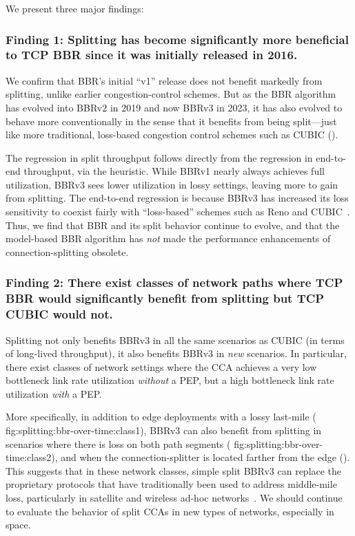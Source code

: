 We present three major findings:

\subsubsection{Finding 1: Splitting has become significantly more beneficial to
 TCP BBR since it was initially released in 2016.}

We confirm that BBR's initial ``v1'' release does not benefit markedly from splitting, unlike earlier
congestion-control schemes. But as the BBR algorithm
has evolved into BBRv2 in 2019 and now BBRv3 in 2023, it has also evolved to
behave more conventionally in the sense that it benefits from being
split---just like more traditional, loss-based congestion control schemes such
as CUBIC ().

The regression in split throughput follows directly from the regression
in end-to-end throughput, via the heuristic. While BBRv1 nearly always achieves
full utilization, BBRv3 sees lower utilization in lossy
settings, leaving more to gain from splitting.
The end-to-end regression is because BBRv3 has increased its loss sensitivity
to coexist fairly with ``loss-based'' schemes such as Reno and
CUBIC~\cite{cardwell2024bbrv3-ietf119,ware2019modeling,zeynali2024promises}.
Thus, we find that BBR and its split behavior continue
to evolve, and that the model-based BBR algorithm has \textit{not} made the
performance enhancements of connection-splitting obsolete.

\subsubsection{Finding 2: There exist classes of network paths where TCP BBR
 would significantly benefit from splitting but TCP CUBIC would not.}

Splitting not only benefits BBRv3 in all the same scenarios as CUBIC (in terms
of long-lived throughput), it also benefits BBRv3 in \textit{new} scenarios. In
particular, there exist classes of network settings where the CCA achieves a
very low bottleneck link rate utilization \textit{without} a PEP, but a high
bottleneck link rate utilization \textit{with} a PEP.

More specifically, in addition to edge deployments with a lossy last-mile (\Cref
{fig:splitting:bbr-over-time:class1}), BBRv3 can also benefit from splitting in
scenarios where there is loss on both path segments (\Cref
{fig:splitting:bbr-over-time:class2}), and when the connection-splitter is located
farther from the edge (). This suggests that in
these network classes, simple split BBRv3 can replace the
proprietary protocols that have traditionally been used to address middle-mile
loss, particularly in satellite and wireless ad-hoc networks~\cite
{cloudsplitting2010,border2020evaluating,rfc3135}. We should continue to
evaluate the behavior of split CCAs in new types of networks, especially in
space.

